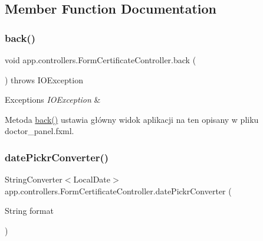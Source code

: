 \subsection{Member Function Documentation}
\mbox{\label{classapp_1_1controllers_1_1_form_certificate_controller_a0c5d9e7a2c2ee91e7c0792a012f4b5c2}} 
\subsubsection{\texorpdfstring{back()}{back()}}
{\footnotesize\ttfamily void app.\+controllers.\+Form\+Certificate\+Controller.\+back (\begin{DoxyParamCaption}{ }\end{DoxyParamCaption}) throws I\+O\+Exception}


\begin{DoxyExceptions}{Exceptions}
{\em I\+O\+Exception} & \\
\hline
\end{DoxyExceptions}
Metoda \mbox{\hyperlink{classapp_1_1controllers_1_1_form_certificate_controller_a0c5d9e7a2c2ee91e7c0792a012f4b5c2}{back()}} ustawia główny widok aplikacji na ten opisany w pliku doctor\+\_\+panel.\+fxml. \mbox{\label{classapp_1_1controllers_1_1_form_certificate_controller_a680747fac245239c02a4b20906e12cd6}} 
\subsubsection{\texorpdfstring{datePickrConverter()}{datePickrConverter()}}
{\footnotesize\ttfamily String\+Converter$<$Local\+Date$>$ app.\+controllers.\+Form\+Certificate\+Controller.\+date\+Pickr\+Converter (\begin{DoxyParamCaption}\item[{String}]{format }\end{DoxyParamCaption})}


